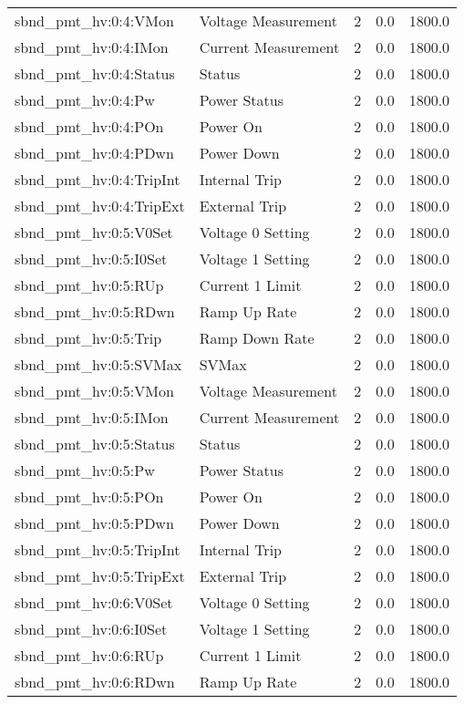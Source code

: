 \begin{center}
\begin{longtable}{l | l l l l }
sbnd\_pmt\_hv:0:4:VMon & Voltage Measurement & 2 & 0.0 & 1800.0\\ 
sbnd\_pmt\_hv:0:4:IMon & Current Measurement & 2 & 0.0 & 1800.0\\ 
sbnd\_pmt\_hv:0:4:Status & Status & 2 & 0.0 & 1800.0\\ 
sbnd\_pmt\_hv:0:4:Pw & Power Status & 2 & 0.0 & 1800.0\\ 
sbnd\_pmt\_hv:0:4:POn & Power On & 2 & 0.0 & 1800.0\\ 
sbnd\_pmt\_hv:0:4:PDwn & Power Down & 2 & 0.0 & 1800.0\\ 
sbnd\_pmt\_hv:0:4:TripInt & Internal Trip & 2 & 0.0 & 1800.0\\ 
sbnd\_pmt\_hv:0:4:TripExt & External Trip & 2 & 0.0 & 1800.0\\ 
sbnd\_pmt\_hv:0:5:V0Set & Voltage 0 Setting & 2 & 0.0 & 1800.0\\ 
sbnd\_pmt\_hv:0:5:I0Set & Voltage 1 Setting & 2 & 0.0 & 1800.0\\ 
sbnd\_pmt\_hv:0:5:RUp & Current 1 Limit & 2 & 0.0 & 1800.0\\ 
sbnd\_pmt\_hv:0:5:RDwn & Ramp Up Rate & 2 & 0.0 & 1800.0\\ 
sbnd\_pmt\_hv:0:5:Trip & Ramp Down Rate & 2 & 0.0 & 1800.0\\ 
sbnd\_pmt\_hv:0:5:SVMax & SVMax & 2 & 0.0 & 1800.0\\ 
sbnd\_pmt\_hv:0:5:VMon & Voltage Measurement & 2 & 0.0 & 1800.0\\ 
sbnd\_pmt\_hv:0:5:IMon & Current Measurement & 2 & 0.0 & 1800.0\\ 
sbnd\_pmt\_hv:0:5:Status & Status & 2 & 0.0 & 1800.0\\ 
sbnd\_pmt\_hv:0:5:Pw & Power Status & 2 & 0.0 & 1800.0\\ 
sbnd\_pmt\_hv:0:5:POn & Power On & 2 & 0.0 & 1800.0\\ 
sbnd\_pmt\_hv:0:5:PDwn & Power Down & 2 & 0.0 & 1800.0\\ 
sbnd\_pmt\_hv:0:5:TripInt & Internal Trip & 2 & 0.0 & 1800.0\\ 
sbnd\_pmt\_hv:0:5:TripExt & External Trip & 2 & 0.0 & 1800.0\\ 
sbnd\_pmt\_hv:0:6:V0Set & Voltage 0 Setting & 2 & 0.0 & 1800.0\\ 
sbnd\_pmt\_hv:0:6:I0Set & Voltage 1 Setting & 2 & 0.0 & 1800.0\\ 
sbnd\_pmt\_hv:0:6:RUp & Current 1 Limit & 2 & 0.0 & 1800.0\\ 
sbnd\_pmt\_hv:0:6:RDwn & Ramp Up Rate & 2 & 0.0 & 1800.0\\ 

\end{longtable}
\end{center}
